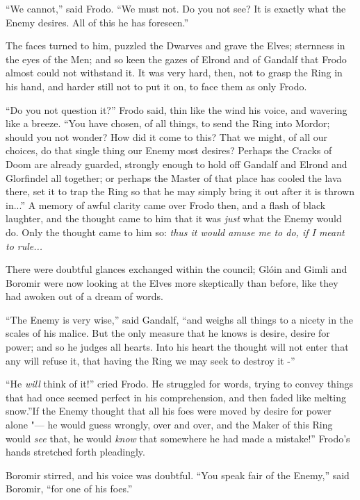 ``We cannot,'' said Frodo. ``We must not. Do you not see? It is exactly
what the Enemy desires. All of this he has foreseen.''

The faces turned to him, puzzled the Dwarves and grave the Elves;
sternness in the eyes of the Men; and so keen the gazes of Elrond and of
Gandalf that Frodo almost could not withstand it. It was very hard,
then, not to grasp the Ring in his hand, and harder still not to put it
on, to face them as only Frodo.

``Do you not question it?'' Frodo said, thin like the wind his voice,
and wavering like a breeze. ``You have chosen, of all things, to send
the Ring into Mordor; should you not wonder? How did it come to this?
That we might, of all our choices, do that single thing our Enemy most
desires? Perhaps the Cracks of Doom are already guarded, strongly enough
to hold off Gandalf and Elrond and Glorfindel all together; or perhaps
the Master of that place has cooled the lava there, set it to trap the
Ring so that he may simply bring it out after it is thrown in...''
A memory of awful clarity came over Frodo then, and a flash of black
laughter, and the thought came to him that it was \emph{just} what the
Enemy would do. Only the thought came to him so: \emph{thus it would
amuse me to do, if I meant to rule...}

There were doubtful glances exchanged within the council; Glóin and
Gimli and Boromir were now looking at the Elves more skeptically than
before, like they had awoken out of a dream of words.

``The Enemy is very wise,'' said Gandalf, ``and weighs all things to a
nicety in the scales of his malice. But the only measure that he knows
is desire, desire for power; and so he judges all hearts. Into his heart
the thought will not enter that any will refuse it, that having the Ring
we may seek to destroy it -''

``He \emph{will} think of it!'' cried Frodo. He struggled for words,
trying to convey things that had once seemed perfect in his
comprehension, and then faded like melting snow.''If the Enemy thought
that all his foes were moved by desire for power alone "--- he would guess
wrongly, over and over, and the Maker of this Ring would \emph{see}
that, he would \emph{know} that somewhere he had made a mistake!''
Frodo's hands stretched forth pleadingly.

Boromir stirred, and his voice was doubtful. ``You speak fair of the
Enemy,'' said Boromir, ``for one of his foes.''

